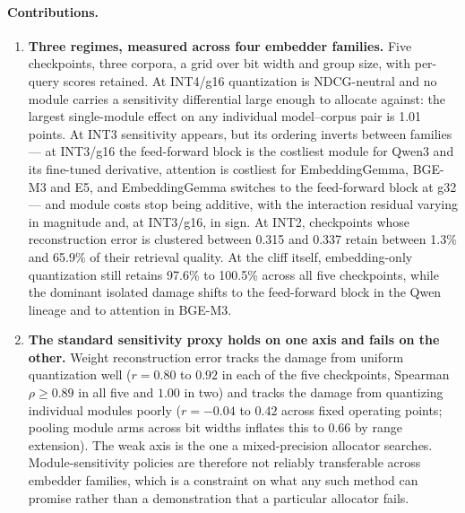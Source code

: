 \documentclass[11pt]{article}
\begin{document}
\paragraph{Contributions.}
\begin{enumerate}
\item \textbf{Three regimes, measured across four embedder families.} Five checkpoints, three
corpora, a grid over bit width and group size, with per-query scores retained. At INT4/g16 quantization
is NDCG-neutral and no module carries a sensitivity differential large enough to allocate against: the
largest single-module effect on any individual model--corpus pair is 1.01 points. At INT3 sensitivity appears, but its
ordering inverts between families --- at INT3/g16 the feed-forward block is the costliest
module for Qwen3 and its fine-tuned derivative, attention is costliest for EmbeddingGemma,
BGE-M3 and E5, and EmbeddingGemma switches to the feed-forward block at g32 --- and module costs stop
being additive, with the
interaction residual varying in magnitude and, at INT3/g16, in sign. At INT2, checkpoints whose
reconstruction error is clustered between 0.315 and 0.337 retain between 1.3\% and 65.9\% of
their retrieval quality. At the cliff itself, embedding-only quantization still retains
97.6\% to 100.5\% across all five checkpoints, while the dominant isolated damage shifts to
the feed-forward block in the Qwen lineage and to attention in BGE-M3.

\item \textbf{The standard sensitivity proxy holds on one axis and fails on the other.}
Weight reconstruction error tracks the damage from uniform quantization well ($r=0.80$ to
$0.92$ in each of the five checkpoints, Spearman $\rho\geq0.89$ in all five and $1.00$ in two) and tracks the damage from
quantizing individual modules poorly ($r=-0.04$ to $0.42$ across fixed operating points; pooling
module arms across bit widths inflates this to $0.66$ by range extension). The weak axis is
the one a mixed-precision allocator searches. Module-sensitivity policies are therefore not
reliably transferable across embedder families, which is a constraint on what any such method
can promise rather than a demonstration that a particular allocator fails.


\end{enumerate}
\end{document}

